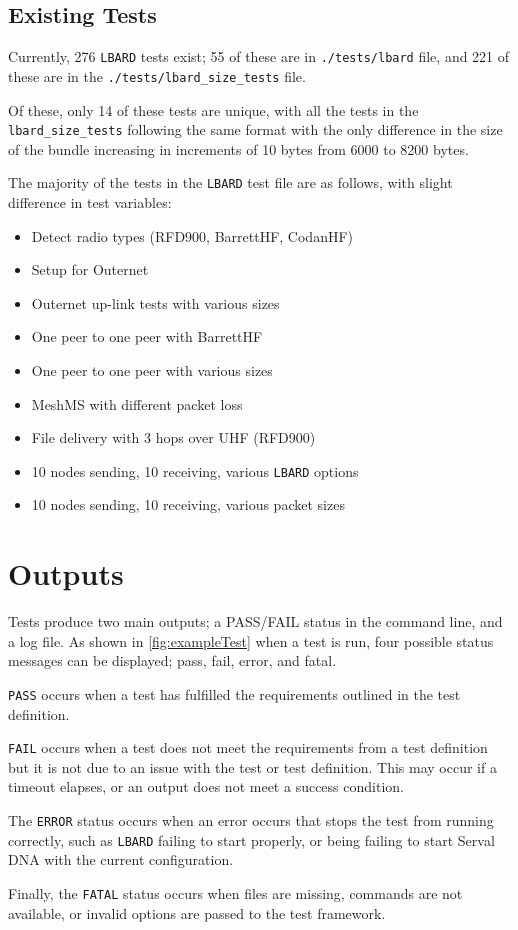 \subsection{Existing Tests}
Currently, 276 \texttt{LBARD} tests exist; 55 of these are in \texttt{./tests/lbard} file, and 221 of these are in the \texttt{./tests/lbard\_size\_tests} file.

Of these, only 14 of these tests are unique, with all the tests in the \texttt{lbard\_size\_tests} following the same format with the only difference in the size of the bundle increasing in increments of 10 bytes from 6000 to 8200 bytes.

The majority of the tests in the \texttt{LBARD} test file are as follows, with slight difference in test variables:
\begin{itemize}
    \item Detect radio types (RFD900, BarrettHF, CodanHF)
    \item Setup for Outernet
    \item Outernet up-link tests with various sizes
    \item One peer to one peer with BarrettHF
    \item One peer to one peer with various sizes
    \item MeshMS with different packet loss
    \item File delivery with 3 hops over UHF (RFD900)
    \item 10 nodes sending, 10 receiving, various \texttt{LBARD} options
    \item 10 nodes sending, 10 receiving, various packet sizes
\end{itemize}


\section{Outputs}
Tests produce two main outputs; a PASS/FAIL status in the command line, and a log file.
As shown in \figurename{ \ref{fig:exampleTest}} when a test is run, four possible status messages can be displayed; pass, fail, error, and fatal.
\begin{list}{}{}
    \item \texttt{PASS} occurs when a test has fulfilled the requirements outlined in the test definition.

    \item \texttt{FAIL} occurs when a test does not meet the requirements from a test definition but it is not due to an issue with the test or test definition. This may occur if a timeout elapses, or an output does not meet a success condition.
    
    \item The \texttt{ERROR} status occurs when an error occurs that stops the test from running correctly, such as \texttt{LBARD} failing to start properly, or being failing to start Serval DNA with the current configuration.
    
    \item Finally, the \texttt{FATAL} status occurs when files are missing, commands are not available, or invalid options are passed to the test framework.
\end{list}

